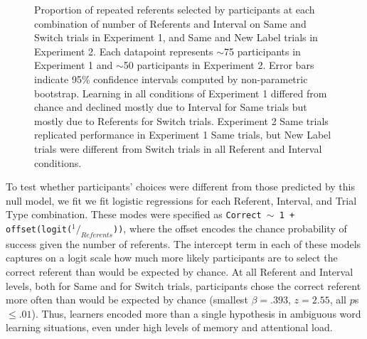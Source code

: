 \documentclass[man,floatsintext]{apa6}
\begin{document}
 \begin{figure}[tb]
	\caption{\label{fig:exp1_2_data} Proportion of repeated referents selected by participants at each combination of number of Referents and Interval on Same and Switch trials in Experiment 1, and Same and New Label trials in Experiment 2. Each datapoint represents $\sim$75 participants in Experiment 1 and  $\sim$50 participants in Experiment 2. Error bars indicate 95\% confidence intervals computed by non-parametric bootstrap. Learning in all conditions of Experiment 1 differed from chance and declined mostly due to Interval for Same trials but mostly due to Referents for Switch trials. Experiment 2 Same trials replicated performance in Experiment 1 Same trials, but New Label trials were different from Switch trials in all Referent and Interval conditions.} 
\end{figure}

To test whether participants' choices were different from those predicted by this null model, we fit we fit logistic regressions for each Referent, Interval, and Trial Type combination. These modes were specified as {\small \tt{Correct $\sim$ 1 + offset(logit($^1/_{Referents}$))}}, where the offset encodes the chance probability of success given the number of referents. The intercept term in each of these models captures on a logit scale how much more likely participants are to select the correct referent than would be expected by chance. At all Referent and Interval levels, both for Same and for Switch trials, participants chose the correct referent more often than would be expected by chance (smallest $\beta =  .393$, $z=2.55$, all $p$s $\leq .01$). Thus, learners encoded more than a single hypothesis in ambiguous word learning situations, even under high levels of memory and attentional load. 
\end{document}
